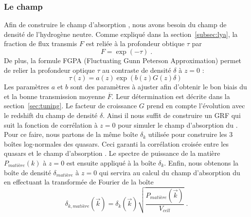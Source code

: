 \documentclass[11pt, twoside, a4paper, openright]{report}
\begin{document}
\subsubsection{Le champ \lya{}}
Afin de construire le champ d'absorption \lya{}, nous avons besoin du champ de densité de l'hydrogène neutre. Comme expliqué dans la section~\ref{subsec:lya}, la fraction de flux transmis $F$ est reliée à la profondeur obtique $\tau$ par
\begin{equation}
  F = \exp(- \tau) \; .
\end{equation}
De plus, la formule FGPA (Fluctuating Gunn Peterson Approximation) permet de relier la profondeur optique $\tau$ au contraste de densité $\delta$ à $z = 0$ :
\begin{equation}
  \label{eq:fgpa1}
  \tau(z) = a(z) \exp(b(z) G(z) \delta) \;
\end{equation}
Les paramètres $a$ et $b$ sont des paramètres à ajuster afin d'obtenir le bon biais du \lya{} et la bonne transmission moyenne $\overline F$. Leur détermination est décrite dans la section~\ref{sec:tuning}. Le facteur de croissance $G$ prend en compte l'évolution avec le redshift du champ de densité $\delta$. Ainsi il nous suffit de construire un GRF qui suit la fonction de corrélation à $z=0$ pour simuler le champ d'absorption du \lya{}. Pour ce faire, nous partons de la même boîte $\delta_k$ utilisée pour construire les 3 boîtes log-normales des quasars. Ceci garanti la corrélation croisée entre les quasars et le champ d'absorption \lya{}. Le spectre de puissance de la matière $P_{matière}(k)$ à $z=0$ est ensuite appliqué à la boîte $\delta_k$. Enfin, nous obtenons la boîte de densité $\delta_{matière}$ à $z = 0$ qui servira au calcul du champ d'absorption du \lya{} en effectuant la transformée de Fourier de la boîte
\begin{equation}
  \delta_{k, matière}(\vec k)  = \delta_k(\vec k) \sqrt{\frac{P_{matière}(\vec k)}{V_{cell}}} \; .
\end{equation}
\end{document}
